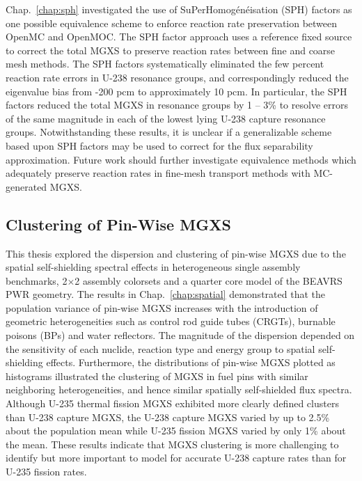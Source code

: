 Chap.~\ref{chap:sph} investigated the use of SuPerHomog\'{e}n\'{e}isation (SPH) factors as one possible equivalence scheme to enforce reaction rate preservation between OpenMC and OpenMOC. The \ac{SPH} factor approach uses a reference fixed source to correct the total \ac{MGXS} to preserve reaction rates between fine and coarse mesh methods. The \ac{SPH} factors systematically eliminated the few percent reaction rate errors in U-238 resonance groups, and correspondingly reduced the eigenvalue bias from -200 \ac{pcm} to approximately 10 \ac{pcm}. In particular, the \ac{SPH} factors reduced the total \ac{MGXS} in resonance groups by 1 -- 3\% to resolve errors of the same magnitude in each of the lowest lying U-238 capture resonance groups. Notwithstanding these results, it is unclear if a generalizable scheme based upon \ac{SPH} factors may be used to correct for the flux separability approximation. Future work should further investigate equivalence methods which adequately preserve reaction rates in fine-mesh transport methods with \ac{MC}-generated \ac{MGXS}.


\subsection{Clustering of Pin-Wise MGXS}
\label{subsec:chap12-mgxs-clustering}

This thesis explored the dispersion and clustering of pin-wise \ac{MGXS} due to the spatial self-shielding spectral effects in heterogeneous single assembly benchmarks, 2$\times$2 assembly colorsets and a quarter core model of the \ac{BEAVRS} \ac{PWR} geometry. The results in Chap.~\ref{chap:spatial} demonstrated that the population variance of pin-wise \ac{MGXS} increases with the introduction of geometric heterogeneities such as control rod guide tubes (CRGTs), burnable poisons (BPs) and water reflectors. The magnitude of the dispersion depended on the sensitivity of each nuclide, reaction type and energy group to spatial self-shielding effects. Furthermore, the distributions of pin-wise \ac{MGXS} plotted as histograms illustrated the clustering of \ac{MGXS} in fuel pins with similar neighboring heterogeneities, and hence similar spatially self-shielded flux spectra. Although U-235 thermal fission \ac{MGXS} exhibited more clearly defined clusters than U-238 capture \ac{MGXS}, the U-238 capture \ac{MGXS} varied by up to 2.5\% about the population mean while U-235 fission \ac{MGXS} varied by only 1\% about the mean. These results indicate that \ac{MGXS} clustering is more challenging to identify but more important to model for accurate U-238 capture rates than for U-235 fission rates.


